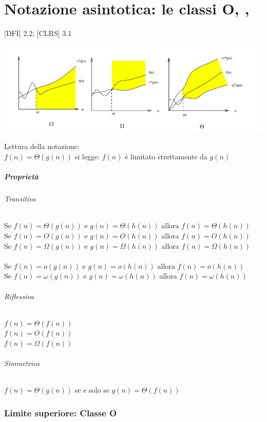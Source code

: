 \chapter{Notazione asintotica: le classi O, \Omega, \Theta}

{{[}DFI{]} 2.2; {[}CLRS{]} 3.1}

\includegraphics{images/classi_asintotiche.jpg}

Lettura della notazione: \\

$f(n) = \Theta(g(n))$ si legge: $f(n)$ è limitato strettamente da $g(n)$

\paragraph{Proprietà}

\subparagraph{Transitiva}

Se $f(n) = \Theta(g(n))$ e $g(n) = \Theta(h(n))$ allora $f(n) = \Theta(h(n))$ \\
Se $f(n) = O(g(n))$ e $g(n) = O(h(n))$ allora $f(n) = O(h(n))$ \\
Se $f(n) = \Omega(g(n))$ e $g(n) = \Omega(h(n))$ allora $f(n) = \Omega(h(n))$ \\
\\
Se $f(n) = o(g(n))$ e $g(n) = o(h(n))$ allora $f(n) = o(h(n))$ \\
Se $f(n) = \omega(g(n))$ e $g(n) = \omega(h(n))$ allora $f(n) = \omega(h(n))$


\subparagraph{Riflessiva}

$f(n) = \Theta(f(n))$ \\
$f(n) = O(f(n))$ \\
$f(n) = \Omega(f(n))$

\subparagraph{Simmetrica}

$f(n) = \Theta(g(n))$ se e solo se $g(n) = \Theta(f(n))$

\subsection{Limite superiore: Classe O}

